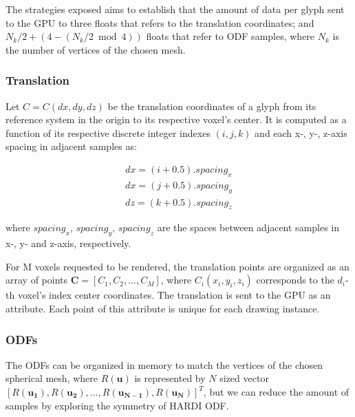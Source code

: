 \documentclass[twoside,twocolumn,10pt]{article}
\begin{document}
The strategies exposed aims to establish that the amount of data per glyph sent to the GPU to three floats that refers to the translation coordinates; and $N_k/2 + (4 - (N_k/2 \bmod 4))$ floats that refer to ODF samples, where $N_k$ is the number of vertices of the chosen mesh.


\subsubsection{Translation}
Let $C= C(dx, dy, dz)$ be the translation coordinates of a glyph from its reference system in the origin to its respective voxel's center. It is computed as a function of its respective discrete integer indexes $(i, j, k)$ and each x-, y-, z-axis spacing in adjacent samples as:

\begin{align}
 \label{eq::translation}
    dx = (i + 0.5).spacing_x \nonumber\\
    dx = (j + 0.5).spacing_y \\
    dz = (k + 0.5).spacing_z \nonumber
\end{align}

where $spacing_x$, $spacing_y$, $spacing_z$ are the spaces between adjacent samples in x-, y- and z-axis, respectively.


For M voxels requested to be rendered, the translation points are organized as an array of points $\bm{C} = [C_1,C_2, \dots, C_M]$, where $C_i(x_i, y_i, z_i)$ corresponds to the $d_i$-th voxel's index center coordinates. The translation is sent to the GPU as an attribute. Each point of this attribute is unique for each drawing instance.




\subsubsection{ODFs}

The ODFs can be organized in memory to match the vertices of the chosen spherical mesh, where  $R(\bm{u})$ is represented by $N$ sized vector $[R(\bm{u_1}), R(\bm{u_2}), ..., R(\bm{u_{N-1}}), R(\bm{u_{N}})]^T$, but we can reduce the amount of samples by exploring the symmetry of HARDI ODF.
\end{document}
